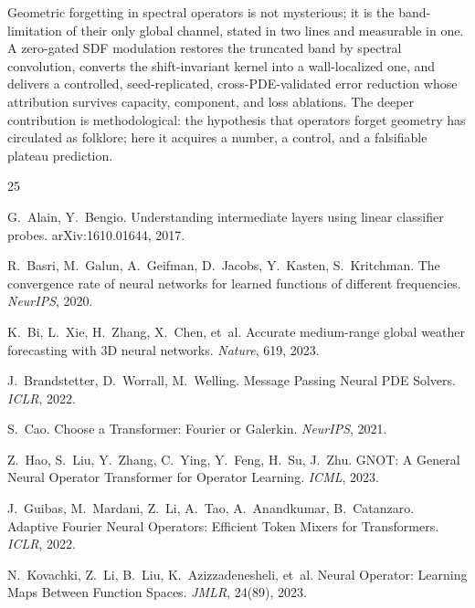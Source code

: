 \documentclass[11pt]{article}
\theoremstyle{definition}
\begin{document}
Geometric forgetting in spectral operators is not mysterious; it is the
band-limitation of their only global channel, stated in two lines and
measurable in one. A zero-gated SDF modulation restores the truncated band
by spectral convolution, converts the shift-invariant kernel into a
wall-localized one, and delivers a controlled, seed-replicated,
cross-PDE-validated error reduction whose attribution survives capacity,
component, and loss ablations. The deeper contribution is methodological:
the hypothesis that operators forget geometry has circulated as folklore;
here it acquires a number, a control, and a falsifiable plateau prediction.


\begin{thebibliography}{25}

G.~Alain, Y.~Bengio.
\newblock Understanding intermediate layers using linear classifier probes.
\newblock arXiv:1610.01644, 2017.

R.~Basri, M.~Galun, A.~Geifman, D.~Jacobs, Y.~Kasten, S.~Kritchman.
\newblock The convergence rate of neural networks for learned functions of
different frequencies.
\newblock \emph{NeurIPS}, 2020.

K.~Bi, L.~Xie, H.~Zhang, X.~Chen, et~al.
\newblock Accurate medium-range global weather forecasting with 3D neural
networks.
\newblock \emph{Nature}, 619, 2023.

J.~Brandstetter, D.~Worrall, M.~Welling.
\newblock Message Passing Neural PDE Solvers.
\newblock \emph{ICLR}, 2022.

S.~Cao.
\newblock Choose a Transformer: Fourier or Galerkin.
\newblock \emph{NeurIPS}, 2021.

Z.~Hao, S.~Liu, Y.~Zhang, C.~Ying, Y.~Feng, H.~Su, J.~Zhu.
\newblock GNOT: A General Neural Operator Transformer for Operator Learning.
\newblock \emph{ICML}, 2023.

J.~Guibas, M.~Mardani, Z.~Li, A.~Tao, A.~Anandkumar, B.~Catanzaro.
\newblock Adaptive Fourier Neural Operators: Efficient Token Mixers for
Transformers.
\newblock \emph{ICLR}, 2022.

N.~Kovachki, Z.~Li, B.~Liu, K.~Azizzadenesheli, et~al.
\newblock Neural Operator: Learning Maps Between Function Spaces.
\newblock \emph{JMLR}, 24(89), 2023.


\end{thebibliography}
\end{document}
